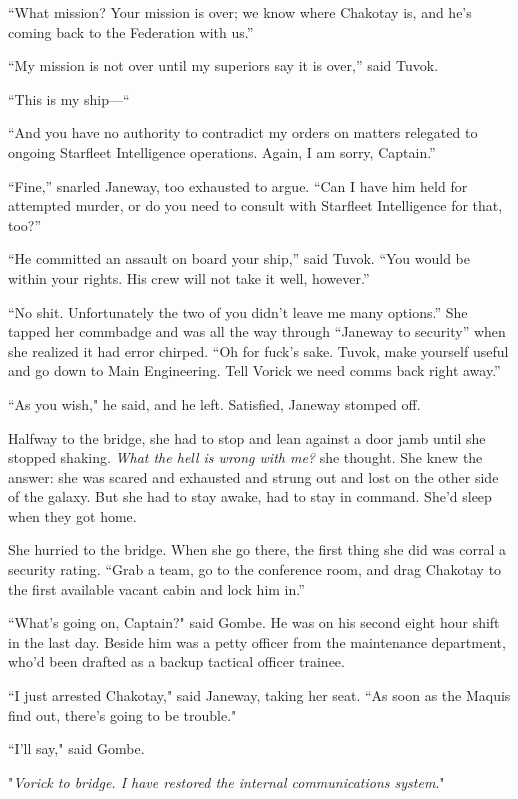 \documentclass[twoside,letterpaper,12pt]{memoir}
\begin{document}
``What mission? Your mission is over; we know where Chakotay is, and he’s coming back to the Federation with us.''

``My mission is not over until my superiors say it is over,'' said Tuvok.

``This is my ship—``

``And you have no authority to contradict my orders on matters relegated to ongoing Starfleet Intelligence operations. Again, I am sorry, Captain.''

``Fine,'' snarled Janeway, too exhausted to argue. ``Can I have him held for attempted murder, or do you need to consult with Starfleet Intelligence for that, too?''

``He committed an assault on board your ship,'' said Tuvok. ``You would be within your rights. His crew will not take it well, however.''

``No shit. Unfortunately the two of you didn’t leave me many options.'' She tapped her commbadge and was all the way through ``Janeway to security'' when she realized it had error chirped. ``Oh for fuck's sake. Tuvok, make yourself useful and go down to Main Engineering. Tell Vorick we need comms back right away.''

``As you wish," he said, and he left. Satisfied, Janeway stomped off.

Halfway to the bridge, she had to stop and lean against a door jamb until she stopped shaking. \textit{What the hell is wrong with me?} she thought. She knew the answer: she was scared and exhausted and strung out and lost on the other side of the galaxy. But she had to stay awake, had to stay in command. She'd sleep when they got home.

She hurried to the bridge. When she go there, the first thing she did was corral a security rating. ``Grab a team, go to the conference room, and drag Chakotay to the first available vacant cabin and lock him in.''

``What's going on, Captain?" said Gombe. He was on his second eight hour shift in the last day. Beside him was a petty officer from the maintenance department, who'd been drafted as a backup tactical officer trainee.

``I just arrested Chakotay," said Janeway, taking her seat. ``As soon as the Maquis find out, there's going to be trouble."

``I'll say," said Gombe.

"\textit{Vorick to bridge. I have restored the internal communications system}."
\end{document}
